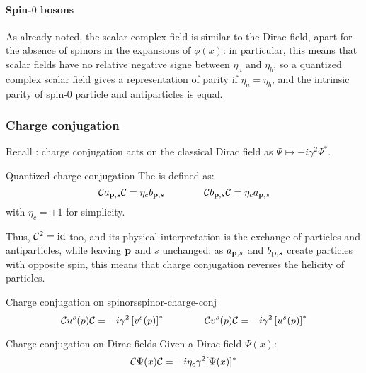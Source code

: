 \paragraph{Spin-$ 0 $ bosons}

As already noted, the scalar complex field is similar to the Dirac field, apart for the absence of spinors in the expansions of $ \phi(x) $: in particular, this means that scalar fields have no relative negative signe between $ \eta_a $ and $ \eta_b $, so a quantized complex scalar field gives a representation of parity if $ \eta_a = \eta_b $, and the intrinsic parity of spin-$ 0 $ particle and antiparticles is equal.

\subsubsection{Charge conjugation}

Recall : charge conjugation acts on the classical Dirac field as $ \Psi \mapsto -i \gamma^2 \Psi^* $.

\begin{definition}{Quantized charge conjugation}{}
  The  is defined as:
  \begin{equation}
    \mathcal{C} a_{\mathbf{p},s} \mathcal{C} = \eta_c b_{\mathbf{p},s}
    \qquad \qquad
    \mathcal{C} b_{\mathbf{p},s} \mathcal{C} = \eta_c a_{\mathbf{p},s}
    \label{eq:charge-conj-op}
  \end{equation}
  with $ \eta_c = \pm 1 $ for simplicity.
\end{definition}

Thus, $ \mathcal{C}^2 = \operatorname{id} $ too, and its physical interpretation is the exchange of particles and antiparticles, while leaving $ \mathbf{p} $ and $ s $ unchanged: as $ a_{\mathbf{p},s} $ and $ b_{\mathbf{p},s} $ create particles with opposite spin, this means that charge conjugation reverses the helicity of particles.

\begin{lemma}[before upper = {\tcbtitle}]{Charge conjugation on spinors}{spinor-charge-conj}
  \begin{equation}
    \mathcal{C} u^s(p) \mathcal{C} = -i \gamma^2 \left[ v^s(p) \right]^*
    \qquad \qquad
    \mathcal{C} v^s(p) \mathcal{C} = -i \gamma^2 \left[ u^s(p) \right]^*
    \label{eq:charge-conj-spin}
  \end{equation}
\end{lemma}

\begin{proposition}{Charge conjugation on Dirac fields}{}
  Given a Dirac field $ \Psi(x) $:
  \begin{equation}
    \mathcal{C} \Psi(x) \mathcal{C} = -i \eta_c \gamma^2 [\Psi(x)]^*
  \end{equation}
\end{proposition}

